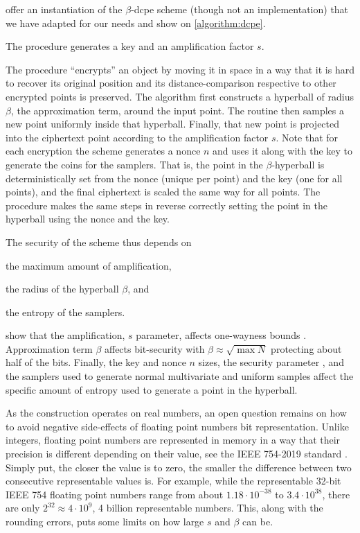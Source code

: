 		

		\textcite{dcpe} offer an instantiation of the $\beta$-\acrshort{dcpe} scheme (though not an implementation) that we have adapted for our needs and show on \cref{algorithm:dcpe}.

		The  procedure generates a key \key{} and an amplification factor $s$.

		The  procedure ``encrypts'' an object by moving it in space in a way that it is hard to recover its original position and its distance-comparison respective to other encrypted points is preserved.
		The algorithm first constructs a hyperball of radius $\beta$, the approximation term, around the input point.
		The routine then samples a new point uniformly inside that hyperball.
		Finally, that new point is projected into the ciphertext point according to the amplification factor $s$.
		Note that for each encryption the scheme generates a nonce $n$ and uses it along with the key \key{} to generate the coins for the samplers.
		That is, the point in the $\beta$-hyperball is deterministically set from the nonce (unique per point) and the key (one for all points), and the final ciphertext is scaled the same way for all points.
		The  procedure makes the same steps in reverse correctly setting the point in the hyperball using the nonce and the key.

		

		The security of the scheme thus depends on
		\begin{enumerate*}[label={(\roman*)}]
			\item the maximum amount of amplification,
			\item the radius of the hyperball $\beta$, and
			\item the entropy of the samplers.
		\end{enumerate*}
		\textcite{dcpe} show that the amplification, $s$ parameter, affects one-wayness bounds \cite[Section 7.2]{dcpe}.
		Approximation term $\beta$ affects bit-security with $\beta \approx \sqrt{\max N}$ protecting about half of the bits.
		Finally, the key \key{} and nonce $n$ sizes, the security parameter \secparam{}, and the samplers used to generate normal multivariate and uniform samples affect the specific amount of entropy used to generate a point in the hyperball.

		As the construction operates on real numbers, an open question remains on how to avoid negative side-effects of floating point numbers bit representation.
		Unlike integers, floating point numbers are represented in memory in a way that their precision is different depending on their value, see the IEEE 754-2019 standard \cite{ieee-floating-point}. %
		Simply put, the closer the value is to zero, the smaller the difference between two consecutive representable values is.
		For example, while the representable 32-bit IEEE 754 floating point numbers range from about $1.18 \cdot 10^{-38}$ to $3.4 \cdot 10^{38}$, there are only $2^{32} \approx 4 \cdot 10^9$, 4 billion representable numbers.
		This, along with the rounding errors, puts some limits on how large $s$ and $\beta$ can be.

